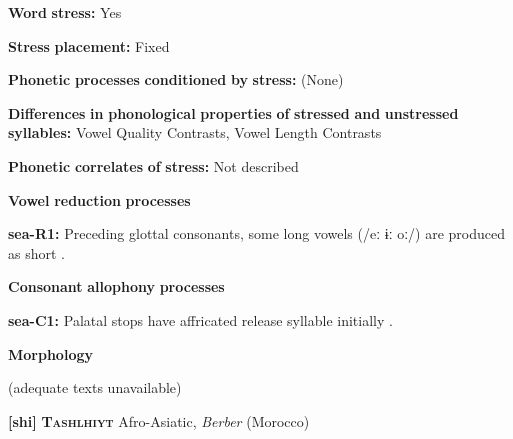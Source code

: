 \begin{styleBody}
\textbf{Word} \textbf{stress:} Yes
\end{styleBody}

\begin{styleBody}
\textbf{Stress} \textbf{placement:} Fixed
\end{styleBody}

\begin{styleBody}
\textbf{Phonetic} \textbf{processes} \textbf{conditioned} \textbf{by} \textbf{stress:} (None)
\end{styleBody}

\begin{styleBody}
\textbf{Differences} \textbf{in} \textbf{phonological} \textbf{properties} \textbf{of} \textbf{stressed} \textbf{and} \textbf{unstressed} \textbf{syllables:} Vowel Quality Contrasts, Vowel Length Contrasts
\end{styleBody}

\begin{styleBody}
\textbf{Phonetic} \textbf{correlates} \textbf{of} \textbf{stress:} Not described
\end{styleBody}

\begin{styleBody}
\textbf{Vowel} \textbf{reduction} \textbf{processes}
\end{styleBody}

\begin{styleBody}
\textbf{sea-R1:} Preceding glottal consonants, some long vowels (/eː ɨː oː/) are produced as short \citep[10-11]{Philips2007}.
\end{styleBody}

\begin{styleBody}
\textbf{Consonant} \textbf{allophony} \textbf{processes}
\end{styleBody}

\begin{styleBody}
\textbf{sea-C1:} Palatal stops have affricated release syllable initially \citep[5]{Philips2007}.
\end{styleBody}

\begin{styleBody}
\textbf{Morphology}
\end{styleBody}

\begin{styleBody}
(adequate texts unavailable)
\end{styleBody}

\begin{styleBody}
\textbf{[shi]}   \textbf{\textsc{Tashlhiyt}}  Afro-Asiatic, \textit{Berber} (Morocco)
\end{styleBody}

